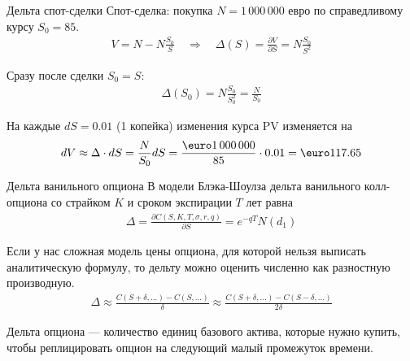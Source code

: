 \documentclass{beamer}
\renewcommand{\EUR}[1]{\textup{\euro}#1}
\begin{document}
\begin{frame}{Дельта спот-сделки}
\justify
Спот-сделка: покупка $N=1\,000\,000$ евро по справедливому курсу $S_0=85$.
\begin{align*}
V = N - N\frac{S_0}{S} \quad \Rightarrow \quad \Delta(S) = \frac{\partial V}{\partial S} = N\frac{S_0}{S^2}
\end{align*}

\justify
Сразу после сделки $S_0=S$:
\begin{align*}
\Delta(S_0) = N\frac{S_0}{S_0^2} = \frac{N}{S_0}
\end{align*}

\justify
На каждые $dS=0.01$ (1 копейка) изменения курса PV изменяется на
\begin{align*}
dV \approx \Delta \cdot dS = \frac{N}{S_0}dS = \frac{\EUR{1\,000\,000}}{85}\cdot 0.01 = \EUR{117.65}
\end{align*}
\end{frame}



\begin{frame}{Дельта ванильного опциона}
\justify
В модели Блэка-Шоулза дельта ванильного колл-опциона со страйком $K$ и сроком экспирации $T$ лет равна
\begin{align*}
\Delta = \frac{\partial C(S, K, T, \sigma, r, q)}{\partial S} = e^{-qT}N(d_1)
\end{align*}

\justify
Если у нас сложная модель цены опциона, для которой нельзя выписать аналитическую формулу, то дельту можно оценить численно как разностную производную.
\begin{align*}
\Delta \approx \frac{C(S+\delta,...) - C(S,...)}{\delta} \approx \frac{C(S+\delta,...) - C(S-\delta,...)}{2\delta}
\end{align*}

\justify
Дельта опциона --- количество единиц базового актива, которые нужно купить, чтобы реплицировать опцион на следующий малый промежуток времени.
\end{frame}
\end{document}
